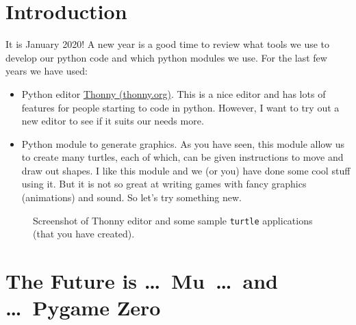\documentclass{coderdojo}
\def\pygameZero{{\pygameZeroFont Pygame Zero}}
\def\MuEditor{{\pygameZeroFont Mu}}
\begin{document}
\maketitle

\section*{Introduction}

It is January 2020! A new year is a good time to review what tools we use to develop our python code and which python modules we use. For the last few years we have used:
\begin{itemize}
\item 
Python editor \href{https://thonny.org}{Thonny (thonny.org)}. This is a nice editor and has lots of features for people starting to code in python. However, I want to try out a new editor to see if it suits our needs more.
\item
Python module  to generate graphics.  As you have seen, this module allow us to create many turtles, each of which, can be given instructions to move and draw out shapes.  I  like this module and we (or you) have done some cool stuff using it. But it is not so great at writing games with fancy graphics (animations) and sound. So let's try something new.

\end{itemize}

\begin{figure}[H]\centering
{}
\caption{Screenshot of Thonny editor and some sample {\tt turtle} applications (that you have created).} 
\end{figure}

\section{The Future is \ldots\ \MuEditor\ \ldots\ and \ldots\ \pygameZero}
\end{document}
